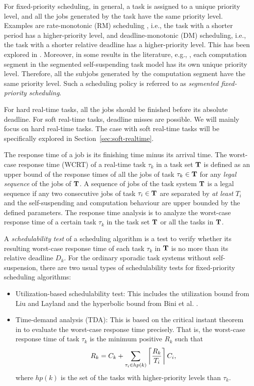 For fixed-priority scheduling, in general, a task is assigned to a
unique priority level, and all the jobs generated by the task have the
same priority level. Examples are rate-monotonic (RM) scheduling
\cite{Liu_1973}, i.e., the task with a shorter period has a
higher-priority level, and deadline-monotonic (DM) scheduling, i.e.,
the task with a shorter relative deadline has a higher-priority level.
This has been explored in
\cite{Raj:suspension1991,RTCSA-KimCPKH95,PH:rtss98,ECRTS-AudsleyB04,RTAS-AudsleyB04,RTCSA-BletsasA05,LR:rtas10,RTSS-KimANR13,LiuChen:rtss2014,huangpass:dac2015,Huang:multiseg,WC16-suspend-DATE}.
Moreover, in some results in the literature, e.g.,
\cite{RTSS-KimANR13,DBLP:journals/ieicet/DingTT09}, each computation
segment in the segmented self-suspending task model has its own unique
priority level. Therefore, all the subjobs generated by the
computation segment have the same priority level. Such a scheduling
policy is referred to as \emph{segmented fixed-priority scheduling}.

For hard real-time tasks, all the jobs should be finished before its
absolute deadline. For soft real-time tasks, deadline misses are
possible. We will mainly focus on hard real-time tasks. The case with
soft real-time tasks will be specifically explored in
Section~\ref{sec:soft-realtime}.

The response time of a job is its finishing time minus its arrival
time.  The worst-case response time (WCRT) of a real-time task
$\tau_k$ in a task set ${\bf T}$ is defined as an upper bound of the
response times of all the jobs of task $\tau_k \in {\bf T}$ for any
\emph{legal sequence} of the jobs of ${\bf T}$. A sequence of jobs of
the task system ${\bf T}$ is a legal sequence if any two consecutive
jobs of task $\tau_i \in {\bf T}$ are separated by \emph{at least}
$T_i$ and the self-suspending and computation behaviour are upper
bounded by the defined parameters. The response time analysis is to
analyze the worst-case response time of a certain task $\tau_k$ in the
task set ${\bf T}$ or all the tasks in ${\bf T}$.

A \emph{schedulability test} of a scheduling algorithm is a test to
verify whether its resulting worst-case response time of each task
$\tau_k$ in ${\bf T}$ is no more than its relative deadline $D_k$. For
the ordinary sporadic task systems without self-suspension, there are
two usual types of schedulability tests for fixed-priority scheduling
algorithms:
\begin{itemize}
\item Utilization-based schedulability test: This includes the
  utilization bound from Liu and Layland \cite{Liu_1973}  and the
  hyperbolic bound from Bini et al. \cite{bini2003rate}.
\item Time-demand analysis (TDA): This is based on the critical instant
  theorem in
  \cite{Liu_1973} to evaluate the worst-case response time
  precisely. That is, the worst-case response time of task $\tau_k$ is
  the minimum positive $R_k$ such that
  \[
  R_k = C_k+ \sum_{\tau_i \in hp(k)}\left\lceil{\frac{R_k}{T_i}}\right\rceil C_i, 
  \]
  where $hp(k)$ is the set of the tasks with higher-priority levels
  than $\tau_k$.  
\end{itemize}

